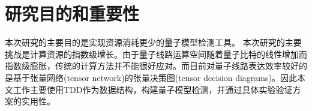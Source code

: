 

\section{研究目的和重要性}
本次研究的主要目的是实现资源消耗更少的量子模型检测工具。
本次研究的主要挑战是计算资源的指数级增长。由于量子线路运算空间随着量子比特的线性增加而指数级膨胀，传统的计算方法并不能很好应对。而目前对量子线路表达效率较好的是基于张量网络(tensor network)的张量决策图(tensor decision diagrams)。因此本文工作主要使用TDD作为数据结构，构建量子模型检测，并通过具体实验验证方案的实用性。


